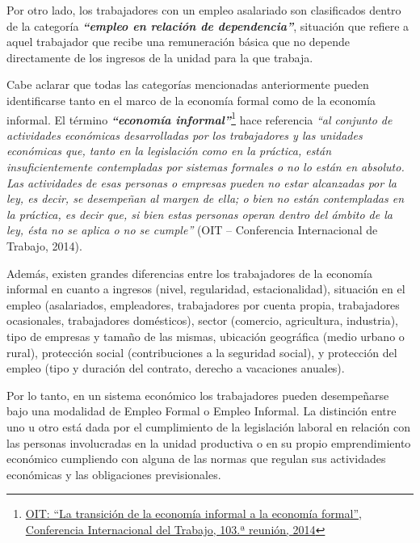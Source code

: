 \documentclass[
  openany]{book}
\begin{document}
Por otro lado, los trabajadores con un empleo asalariado son clasificados dentro de la categoría \textbf{\emph{``empleo en relación de dependencia''}}, situación que refiere a aquel trabajador que recibe una remuneración básica que no depende directamente de los ingresos de la unidad para la que trabaja.

Cabe aclarar que todas las categorías mencionadas anteriormente pueden identificarse tanto en el marco de la economía formal como de la economía informal. El término \textbf{\emph{``economía informal''}}\footnote{\href{https://www.ilo.org/wcmsp5/groups/public/---ed_norm/---relconf/documents/meetingdocument/wcms_218350.pdf}{OIT: ``La transición de la economía informal a la economía formal'', Conferencia Internacional del Trabajo, 103.ª reunión, 2014}} hace referencia \emph{``al conjunto de actividades económicas desarrolladas por los trabajadores y las unidades económicas que, tanto en la legislación como en la práctica, están insuficientemente contempladas por sistemas formales o no lo están en absoluto. Las actividades de esas personas o empresas pueden no estar alcanzadas por la ley, es decir, se desempeñan al margen de ella; o bien no están contempladas en la práctica, es decir que, si bien estas personas operan dentro del ámbito de la ley, ésta no se aplica o no se cumple''} (OIT -- Conferencia Internacional de Trabajo, 2014).

Además, existen grandes diferencias entre los trabajadores de la economía informal en cuanto a ingresos (nivel, regularidad, estacionalidad), situación en el empleo (asalariados, empleadores, trabajadores por cuenta propia, trabajadores ocasionales, trabajadores domésticos), sector (comercio, agricultura, industria), tipo de empresas y tamaño de las mismas, ubicación geográfica (medio urbano o rural), protección social (contribuciones a la seguridad social), y protección del empleo (tipo y duración del contrato, derecho a vacaciones anuales).

Por lo tanto, en un sistema económico los trabajadores pueden desempeñarse bajo una modalidad de Empleo Formal o Empleo Informal. La distinción entre uno u otro está dada por el cumplimiento de la legislación laboral en relación con las personas involucradas en la unidad productiva o en su propio emprendimiento económico cumpliendo con alguna de las normas que regulan sus actividades económicas y las obligaciones previsionales.
\end{document}
